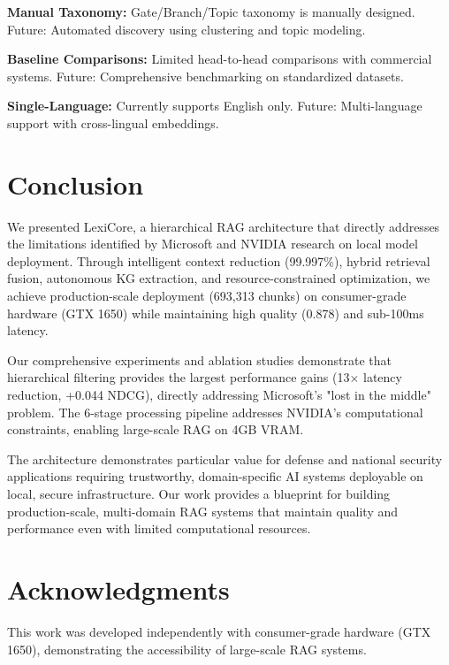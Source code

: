 \documentclass[11pt]{article}
\begin{document}
\textbf{Manual Taxonomy:} Gate/Branch/Topic taxonomy is manually designed. Future: Automated discovery using clustering and topic modeling.

\textbf{Baseline Comparisons:} Limited head-to-head comparisons with commercial systems. Future: Comprehensive benchmarking on standardized datasets.

\textbf{Single-Language:} Currently supports English only. Future: Multi-language support with cross-lingual embeddings.

\section{Conclusion}

We presented LexiCore, a hierarchical RAG architecture that directly addresses the limitations identified by Microsoft and NVIDIA research on local model deployment. Through intelligent context reduction (99.997\%), hybrid retrieval fusion, autonomous KG extraction, and resource-constrained optimization, we achieve production-scale deployment (693,313 chunks) on consumer-grade hardware (GTX 1650) while maintaining high quality (0.878) and sub-100ms latency.

Our comprehensive experiments and ablation studies demonstrate that hierarchical filtering provides the largest performance gains (13× latency reduction, +0.044 NDCG), directly addressing Microsoft's "lost in the middle" problem. The 6-stage processing pipeline addresses NVIDIA's computational constraints, enabling large-scale RAG on 4GB VRAM.

The architecture demonstrates particular value for defense and national security applications requiring trustworthy, domain-specific AI systems deployable on local, secure infrastructure. Our work provides a blueprint for building production-scale, multi-domain RAG systems that maintain quality and performance even with limited computational resources.

\section*{Acknowledgments}

This work was developed independently with consumer-grade hardware (GTX 1650), demonstrating the accessibility of large-scale RAG systems.
\end{document}
